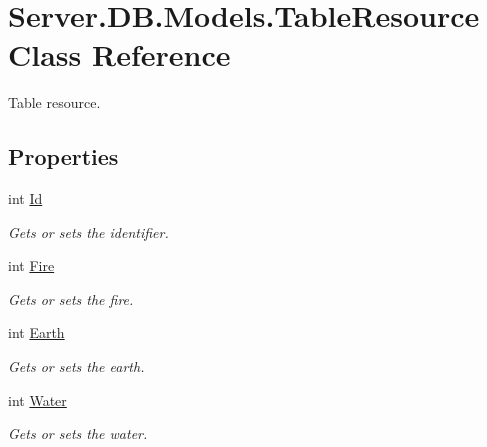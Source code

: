 \hypertarget{classServer_1_1DB_1_1Models_1_1TableResource}{}\section{Server.\+D\+B.\+Models.\+Table\+Resource Class Reference}
\label{classServer_1_1DB_1_1Models_1_1TableResource}


Table resource.  


\subsection*{Properties}
\begin{DoxyCompactItemize}
\item 
int \hyperlink{classServer_1_1DB_1_1Models_1_1TableResource_aa5c47b8d7a24033e408f2166ef37f0ba}{Id}
\begin{DoxyCompactList}\small\item\em Gets or sets the identifier. \end{DoxyCompactList}\item 
int \hyperlink{classServer_1_1DB_1_1Models_1_1TableResource_a0d1e91686bac391d4ff09c6a134d5d5c}{Fire}
\begin{DoxyCompactList}\small\item\em Gets or sets the fire. \end{DoxyCompactList}\item 
int \hyperlink{classServer_1_1DB_1_1Models_1_1TableResource_ae2ff1b6042266fb90faf61be360032f0}{Earth}
\begin{DoxyCompactList}\small\item\em Gets or sets the earth. \end{DoxyCompactList}\item 
int \hyperlink{classServer_1_1DB_1_1Models_1_1TableResource_a38f7464475a01c1e01240c3200af6f37}{Water}
\begin{DoxyCompactList}\small\item\em Gets or sets the water. \end{DoxyCompactList}\item 

\end{DoxyCompactItemize}

